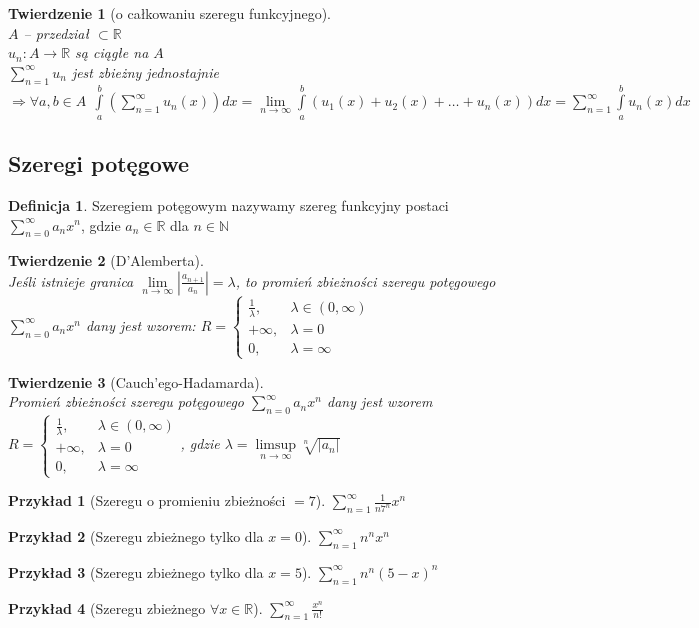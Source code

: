\documentclass[12pt,a4paper]{article}
\newtheorem{tw}{Twierdzenie}
\newtheorem{przyklad}{Przykład}
\theoremstyle{definition}
\newtheorem{df}{Definicja}
\begin{document}
\begin{tw}[o całkowaniu szeregu funkcyjnego]~\\
$A$ -- przedział $\subset \mathbb{R}$\\
$u_n: A \to \mathbb{R}$ są ciągłe na $A$\\
$\sum\limits_{n=1}^\infty u_n$ jest zbieżny jednostajnie
$ \Rightarrow \forall a,b\in A ~~ \int\limits_a^b (\sum\limits_{n=1}^\infty u_n(x))dx = \lim\limits_{n\to\infty}\int\limits_a^b (u_1(x) + u_2(x) + \dots + u_n(x))dx =  \sum\limits_{n=1}^\infty \int\limits_a^b u_n(x)dx$
\end{tw}

\subsection{Szeregi potęgowe}
\begin{df}
Szeregiem potęgowym nazywamy szereg funkcyjny postaci $\sum\limits_{n=0}^\infty a_nx^n$, gdzie $a_n\in\mathbb{R}$ dla $n\in\mathbb{N}$ 
\end{df}

\begin{tw}[D'Alemberta]~\\
Jeśli istnieje granica $\lim\limits_{n\to\infty} |\frac{a_{n+1}}{a_n}| = \lambda $, to promień zbieżności szeregu potęgowego $\sum\limits_{n=0}^\infty a_nx^n$ dany jest wzorem:
$ R = 
	\begin{cases}
		\frac{1}{\lambda}, & \lambda \in (0,\infty)\\
		+\infty, & \lambda = 0\\
		0, & \lambda = \infty
	\end{cases} $
\end{tw}

\begin{tw}[Cauch'ego-Hadamarda]~\\
Promień zbieżności szeregu potęgowego $\sum\limits_{n=0}^\infty a_nx^n$ dany jest wzorem 
$ R = 
	\begin{cases}
		\frac{1}{\lambda}, & \lambda \in (0,\infty)\\
		+\infty, & \lambda = 0\\
		0, & \lambda = \infty
	\end{cases} $, gdzie $\lambda = \limsup\limits_{n\to\infty}\sqrt[n]{|a_n|}$
\end{tw}

\begin{przyklad}[Szeregu o promieniu zbieżności $= 7$]
$\sum\limits_{n=1}^\infty \frac{1}{n7^n}x^n$
\end{przyklad}
\begin{przyklad}[Szeregu zbieżnego tylko dla $x=0$]
$\sum\limits_{n=1}^\infty n^nx^n$
\end{przyklad}
\begin{przyklad}[Szeregu zbieżnego tylko dla $x=5$]
$\sum\limits_{n=1}^\infty n^n(5-x)^n$
\end{przyklad}
\begin{przyklad}[Szeregu zbieżnego $\forall x\in\mathbb{R}$]
$\sum\limits_{n=1}^\infty \frac{x^n}{n!}$
\end{przyklad}
\end{document}
